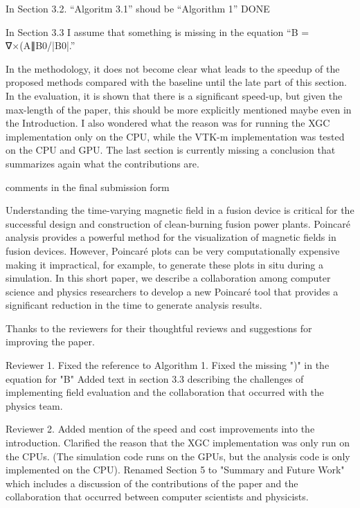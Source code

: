 In Section 3.2.
“Algoritm 3.1” shoud be “Algorithm 1”
DONE

In Section 3.3
I assume that something is missing in the equation “B = ∇×(A∥B0/|B0|.”




 In the methodology, it does not become clear what leads to the speedup of the
    proposed methods compared with the baseline until the late part of this section.
    In the evaluation, it is shown that there is a significant speed-up, but given the
    max-length of the paper, this should be more explicitly mentioned maybe even in
    the Introduction.
    I also wondered what the reason was for running the XGC implementation only on the
    CPU, while the VTK-m implementation was tested on the CPU and GPU.
    The last section is currently missing a conclusion that summarizes again what the
    contributions are.



comments in the final submission form

Understanding the time-varying magnetic field in a fusion device is critical for the successful design and construction of clean-burning fusion power plants. Poincaré analysis provides a powerful method for the visualization of magnetic fields in fusion devices. However, Poincaré plots can be very computationally expensive making it impractical, for example, to generate these plots in situ during a simulation. In this short paper, we describe a collaboration among computer science and physics researchers to develop a new Poincaré tool that provides a significant reduction in the time to generate analysis results.



Thanks to the reviewers for their thoughtful reviews and suggestions for improving the paper.

Reviewer 1.
Fixed the reference to Algorithm 1.
Fixed the missing ")" in the equation for "B"
Added text in section 3.3 describing the challenges of implementing field evaluation and the collaboration that occurred with the physics team.

Reviewer 2.
Added mention of the speed and cost improvements into the introduction.
Clarified the reason that the XGC implementation was only run on the CPUs. (The simulation code runs on the GPUs, but the analysis code is only implemented on the CPU).
Renamed Section 5 to "Summary and Future Work" which includes a discussion of the contributions of the paper and the collaboration that occurred between computer scientists and physicists.



